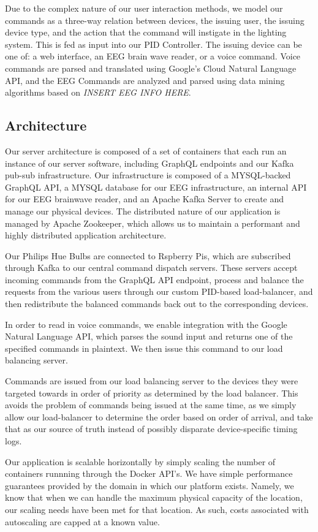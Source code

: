 \documentclass[10pt,twocolumn,letterpaper]{article}
\begin{document}
Due to the complex nature of our user interaction methods, we model our commands
as a three-way relation between devices, the issuing user, the issuing device
type, and the action that the command will instigate in the lighting system.
This is fed as input into our PID Controller. The issuing device can be one of:
a web interface, an EEG brain wave reader, or a voice command. Voice commands
are parsed and translated using Google's Cloud Natural Language API, and the EEG
Commands are analyzed and parsed using data mining algorithms based on
\emph{INSERT EEG INFO HERE}.

\subsection{Architecture}
Our server architecture is composed of a set of containers that each run an
instance of our server software, including GraphQL endpoints and our Kafka
pub-sub infrastructure. Our infrastructure is composed of a MYSQL-backed GraphQL
API, a MYSQL database for our EEG infrastructure, an internal API for our EEG
brainwave reader, and an Apache Kafka Server to create and manage our physical
devices. The distributed nature of our application is managed by Apache
Zookeeper, which allows us to maintain a performant and highly distributed
application architecture.

Our Philips Hue Bulbs are connected to Rspberry Pis, which are subscribed
through Kafka to our central command dispatch servers. These servers accept
incoming commands from the GraphQL API endpoint, process and balance the
requests from the various users through our custom PID-based load-balancer, and
then redistribute the balanced commands back out to the corresponding devices.

In order to read in voice commands, we enable integration with the Google
Natural Language API, which parses the sound input and returns one of the
specified commands in plaintext. We then issue this command to our load
balancing server.

Commands are issued from our load balancing server to the devices they were
targeted towards in order of priority as determined by the load balancer. This
avoids the problem of commands being issued at the same time, as we simply allow
our load-balancer to determine the order based on order of arrival, and take
that as our source of truth instead of possibly disparate device-specific timing
logs.

Our application is scalable horizontally by simply scaling the number of
containers runnning through the Docker API's. We have simple performance
guarantees provided by the domain in which our platform exists. Namely, we know
that when we can handle the maximum physical capacity of the location, our
scaling needs have been met for that location. As such, costs associated with
autoscaling are capped at a known value.
\end{document}
